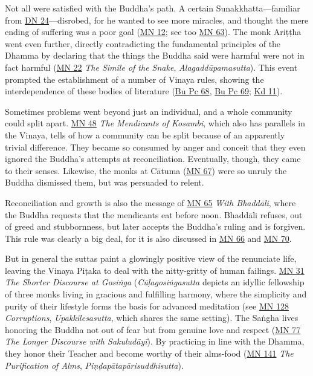 \documentclass[12pt,openany]{book}%
\begin{document}
Not all were satisfied with the Buddha’s path. A certain Sunakkhatta—familiar from \href{https://suttacentral.net/dn24}{DN 24}—disrobed, for he wanted to see more miracles, and thought the mere ending of suffering was a poor goal (\href{https://suttacentral.net/mn12}{MN 12}; see too \href{https://suttacentral.net/mn63}{MN 63}). The monk \textsanskrit{Ariṭṭha} went even further, directly contradicting the fundamental principles of the Dhamma by declaring that the things the Buddha said were harmful were not in fact harmful (\href{https://suttacentral.net/mn22}{MN 22} \textit{The Simile of the Snake}, \textit{\textsanskrit{Alagaddūpamasutta}}). This event prompted the establishment of a number of Vinaya rules, showing the interdependence of these bodies of literature (\href{https://suttacentral.net/pli{-}tv{-}bu{-}vb{-}pc68}{Bu Pc 68}, \href{https://suttacentral.net/pli{-}tv{-}bu{-}vb{-}pc69}{Bu Pc 69}; \href{https://suttacentral.net/pli{-}tv{-}kd11}{Kd 11}).

Sometimes problems went beyond just an individual, and a whole community could split apart. \href{https://suttacentral.net/mn48}{MN 48} \textit{The Mendicants of Kosambi}, which also has parallels in the Vinaya, tells of how a community can be split because of an apparently trivial difference. They became so consumed by anger and conceit that they even ignored the Buddha’s attempts at reconciliation. Eventually, though, they came to their senses. Likewise, the monks at \textsanskrit{Cātuma} (\href{https://suttacentral.net/mn67}{MN 67}) were so unruly the Buddha dismissed them, but was persuaded to relent.

Reconciliation and growth is also the message of \href{https://suttacentral.net/mn65}{MN 65} \textit{With \textsanskrit{Bhaddāli}}, where the Buddha requests that the mendicants eat before noon. \textsanskrit{Bhaddāli} refuses, out of greed and stubbornness, but later accepts the Buddha’s ruling and is forgiven. This rule was clearly a big deal, for it is also discussed in \href{https://suttacentral.net/mn66}{MN 66} and \href{https://suttacentral.net/mn70}{MN 70}.

But in general the suttas paint a glowingly positive view of the renunciate life, leaving the Vinaya \textsanskrit{Piṭaka} to deal with the nitty-gritty of human failings. \href{https://suttacentral.net/mn31}{MN 31} \textit{The Shorter Discourse at \textsanskrit{Gosiṅga}} (\textit{\textsanskrit{Cūḷagosiṅgasutta}} depicts an idyllic fellowship of three monks living in gracious and fulfilling harmony, where the simplicity and purity of their lifestyle forms the basis for advanced meditation (see \href{https://suttacentral.net/mn128}{MN 128} \textit{Corruptions}, \textit{Upakkilesasutta}, which shares the same setting). The \textsanskrit{Saṅgha} lives honoring the Buddha not out of fear but from genuine love and respect (\href{https://suttacentral.net/mn77}{MN 77} \textit{The Longer Discourse with \textsanskrit{Sakuludāyī}}). By practicing in line with the Dhamma, they honor their Teacher and become worthy of their alms-food (\href{https://suttacentral.net/mn141}{MN 141} \textit{The Purification of Alms}, \textit{\textsanskrit{Piṇḍapātapārisuddhisutta}}).
\end{document}
